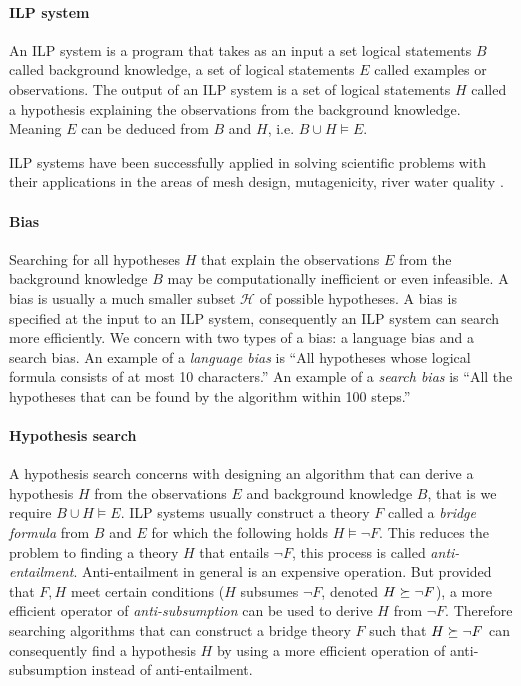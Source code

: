 \paragraph{ILP system}
An ILP system is a program that takes as an input a set logical statements $B$ called background knowledge, a set of logical statements $E$ called examples or observations. The output of an ILP system is a set of logical statements $H$ called a hypothesis explaining the observations from the background knowledge. Meaning $E$ can be deduced from $B$ and $H$, i.e. $B \cup H \models E$.

ILP systems have been successfully applied in solving scientific problems with their applications in the areas of mesh design, mutagenicity, river water quality 
\cite{bratko1995applications}.

\paragraph{Bias}
Searching for all hypotheses $H$ that explain the observations $E$ from the background knowledge $B$ may be computationally inefficient or even infeasible. A bias is usually a much smaller subset $\mathcal{H}$ of possible hypotheses. A bias is specified at the input to an ILP system, consequently an ILP system can search more efficiently. We concern with two types of a bias: a language bias and a search bias. An example of a \emph{language bias} is ``All hypotheses whose logical formula consists of at most 10 characters.'' An example of a \emph{search bias} is ``All the hypotheses that can be found by the algorithm within 100 steps.''

\paragraph{Hypothesis search}
A hypothesis search concerns with designing an algorithm that can derive a hypothesis $H$ from the observations $E$ and background knowledge $B$, that is we require $B \cup H \models E$. ILP systems usually construct a theory $F$ called a \emph{bridge formula} from $B$ and $E$ for which the following holds $H \models \neg F$. This reduces the problem to finding a theory $H$ that entails $\neg F$, this process is called \emph{anti-entailment}. Anti-entailment in general is an expensive operation. But provided that $F, H$ meet certain conditions ($H$ subsumes $\neg F$, denoted $H \succeq \neg F$), a more efficient operator of \emph{anti-subsumption} can be used to derive $H$ from $\neg F$. Therefore searching algorithms that can construct a bridge theory $F$ such that $H \succeq \neg F$ can consequently find a hypothesis $H$ by using a more efficient operation of anti-subsumption instead of anti-entailment.

